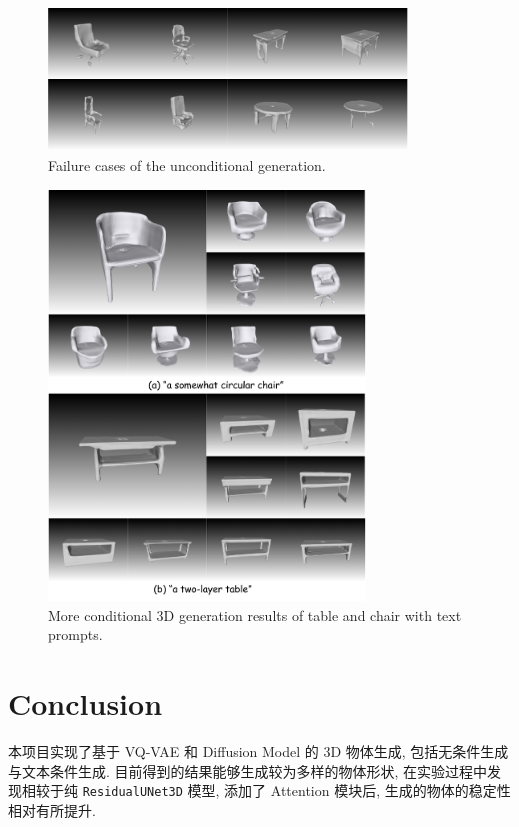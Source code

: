 \documentclass[11pt]{article}
\newcommand\1{\mathds{1}}
\begin{document}
\begin{figure}[htbp]
    \centering 
    \includegraphics[width=0.85\textwidth]{imgs/fail.pdf}
    \caption{Failure cases of the unconditional generation.}
    \label{fig:fail}
\end{figure}

\begin{figure}[htbp]
    \centering
    \includegraphics[width=0.75\textwidth]{imgs/result_text_1.pdf}
    \vspace{-1em}
    \caption{More conditional 3D generation results of table and chair with text prompts.}
    \label{fig:conditional_text_2}
\end{figure}



\section{Conclusion}
本项目实现了基于 VQ-VAE 和 Diffusion Model 的 3D 物体生成, 包括无条件生成与文本条件生成. 目前得到的结果能够生成较为多样的物体形状, 在实验过程中发现相较于纯 \texttt{ResidualUNet3D} 模型, 添加了 Attention 模块后, 生成的物体的稳定性相对有所提升.
\end{document}

